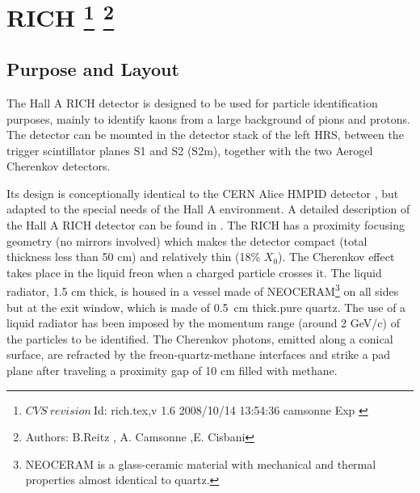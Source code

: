 \chapter[RICH]{RICH
\label{sec:rich}
\footnote{
  $CVS~revision~ $Id: rich.tex,v 1.6 2008/10/14 13:54:36 camsonne Exp $ $
}
\footnote{Authors: B.Reitz , A. Camsonne ,E. Cisbani }
}

\section{Purpose and Layout} 

The Hall A RICH detector is designed to be used for particle identification purposes, mainly 
to identify kaons from a large background of pions and protons. The detector can be mounted in
the detector stack of the left HRS, between the trigger scintillator planes S1 and S2 (S2m),
together with the two Aerogel Cherenkov detectors.

Its design is conceptionally identical 
to the CERN Alice HMPID detector \cite{Beole:1998yq}, but adapted to the special needs
of the Hall A environment.
A detailed description of the Hall A RICH detector can be found in \cite{hallarep02}.
The RICH has a proximity focusing geometry (no mirrors involved) which makes the 
detector compact (total thickness less than 50 cm) and relatively thin (18\% $X_0$).
The Cherenkov effect takes place in the liquid freon 
when a charged particle 
crosses it.
The liquid radiator, 1.5 cm thick, 
is housed in a vessel made of NEOCERAM\footnote{NEOCERAM is
a glass-ceramic material with mechanical and thermal properties
almost identical to quartz.}    
on all sides but
at the exit window, which is made of 0.5~cm thick.pure quartz.  
The use of a liquid radiator has been imposed by the momentum range (around
 2 GeV/c) of the particles to be identified.
The Cherenkov photons, emitted along a conical surface,
are refracted by the 
freon-quartz-methane interfaces and strike 
a pad plane after traveling a proximity gap 
of 10 cm filled with methane.



